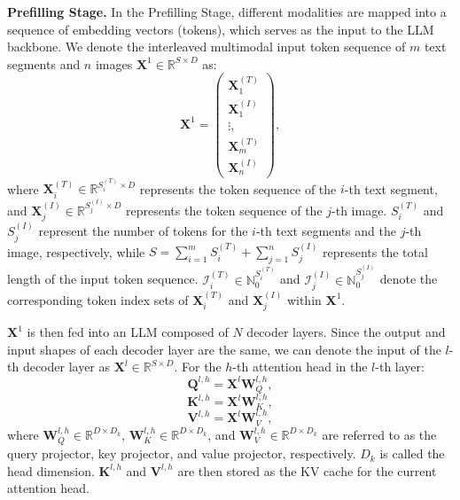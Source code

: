 \noindent \textbf{Prefilling Stage.}  In the Prefilling Stage, different modalities are mapped into a sequence of embedding vectors (tokens), which serves as the input to the LLM backbone. We denote the interleaved multimodal input token sequence of $m$ text segments and $n$ images $\mathbf{X}^1  \in \mathbb{R}^{S \times D}$ as:
\begin{equation}
\mathbf{X}^1 = \begin{pmatrix}
    \mathbf{X}_1^{(T)}\\ \mathbf{X}_1^{(I)}\\ \vdots, \\ \mathbf{X}_m^{(T)}\\ \mathbf{X}_n^{(I)}
\end{pmatrix},
\end{equation}
where $\mathbf{X}_i^{(T)} \in \mathbb{R}^{S_i^{(T)} \times D}$ represents the token sequence of the $i$-th text segment, and $\mathbf{X}_j^{(I)} \in \mathbb{R}^{S_j^{(I)} \times D}$ represents the token sequence of the $j$-th image. $S_i^{(T)}$ and $S_j^{(I)}$ represent the number of tokens for the $i$-th text segments and the $j$-th image, respectively, while \(S = \sum_{i=1}^m S_i^{(T)} + \sum_{j=1}^n S_j^{(I)}\) represents the total length of the input token sequence. $\mathcal{I}^{\left(T\right)}_i \in \mathbb{N}_0^{S^{(T)}_i}$ and $\mathcal{I}^{\left(I\right)}_j \in \mathbb{N}_0^{S^{(I)}_j}$ denote the corresponding token index sets of $\mathbf{X}_i^{\left(T\right)}$ and $\mathbf{X}_j^{\left(I\right)}$ within $\mathbf{X}^1$.

$\mathbf{X}^1$ is then fed into an LLM composed of $N$ decoder layers. Since the output and input shapes of each decoder layer are the same, we can denote the input of the $l$-th decoder layer as $\mathbf{X}^l \in \mathbb{R}^{S \times D}$. For the $h$-th attention head in the $l$-th layer:
\begin{equation}\label{eq:calcq}
\mathbf{Q}^{l, h} = \mathbf{X}^l \mathbf{W}_Q^{l, h},
\end{equation}
\begin{equation}\label{eq:calck}
\mathbf{K}^{l, h} = \mathbf{X}^l \mathbf{W}_K^{l, h},
\end{equation}
\begin{equation}\label{eq:calcv}
\mathbf{V}^{l, h} = \mathbf{X}^l \mathbf{W}_V^{l, h},
\end{equation}
where $\mathbf{W}_Q^{l, h} \in \mathbb{R}^{D \times D_k}$, $\mathbf{W}_K^{l, h} \in \mathbb{R}^{D \times D_k}$, and $\mathbf{W}_V^{l, h} \in \mathbb{R}^{D \times D_k}$ are referred to as the query projector, key projector, and value projector, respectively. $D_k$ is called the head dimension. $\mathbf{K}^{l, h}$ and $\mathbf{V}^{l, h}$ are then stored as the KV cache for the current attention head.

